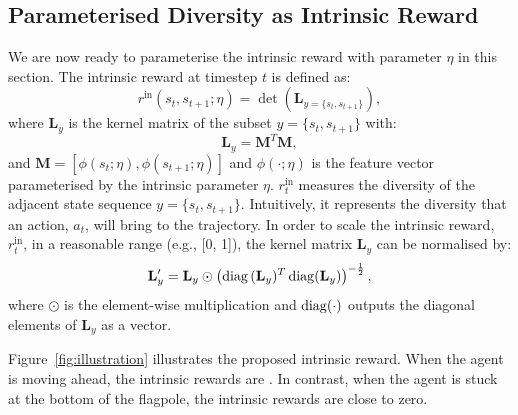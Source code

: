 \subsection{Parameterised Diversity as Intrinsic Reward}
We are now ready to parameterise the intrinsic reward with parameter $\eta$ in this section. The intrinsic reward at timestep $t$ is defined as:
\begin{equation}
    r^{\text{in}}(s_t, s_{t+1}; \eta) = \det\left(\mathbf{L}_{{y}=\{s_{t},s_{t+1}\}}\right),
\label{eq:intrinsic}
\end{equation}
where $\mathbf{L}_{y}$ is the kernel matrix of the subset $y=\{s_{t}, s_{t+1}\}$ with:
\begin{equation}
    \mathbf{L}_{y} = \mathbf{M}^{T}\mathbf{M},
\label{eq:kernel_matrix}
\end{equation}
and $\mathbf{M} = [\phi(s_{t};\eta),\phi(s_{t+1};\eta)]$ and $\phi(\cdot;\eta)$ is the feature vector parameterised by the intrinsic parameter $\eta$.
$r_{t}^{\text{in}}$ measures the diversity of the adjacent state sequence ${y}=\{s_{t},s_{t+1}\}$. Intuitively, it represents the diversity that an action, $a_t$, will bring to the trajectory. In order to scale the intrinsic reward, $r^{\text{in}}_{t}$, in a reasonable range ({e.g.}, [0, 1]), the kernel matrix $\mathbf{L}_{y}$ can be normalised by:
\begin{equation}
    \mathbf{L}_{y}^{\prime} = \mathbf{L}_{y} \odot \left(\operatorname{diag}{(\mathbf{L}_{y}})^{T}\operatorname{diag}({\mathbf{L}_{y}})\right)^{-\frac{1}{2}},
\end{equation}
where $\odot$ is the element-wise multiplication and $\operatorname{diag}(\cdot)$ outputs the diagonal elements of $\mathbf{L}_{y}$ as a vector. 

Figure~\ref{fig:illustration} illustrates the proposed intrinsic reward. When the agent is moving ahead, the intrinsic rewards are . In contrast, when the agent is stuck at the bottom of the flagpole, the intrinsic rewards are close to zero.

